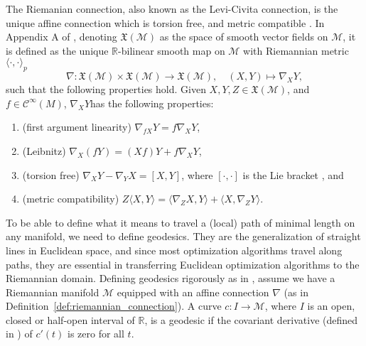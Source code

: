 \begin{definition}\label{def:riemannian_connection}
    The \textup{Riemanian connection}, also known as the \textup{Levi-Civita connection}, is the unique affine connection which is torsion free, and metric compatible \cite[Def.~6.4]{Tu2017}. In Appendix A of \cite{JensenZimmermann2024}, denoting $\mathfrak{X}(\mathcal{M})$ as the space of smooth vector fields on $\mathcal{M}$, it is defined as the unique $\mathbb{R}$-bilinear smooth map on $\mathcal{M}$ with Riemannian metric $\langle \cdot, \cdot\rangle_{p}$
    \begin{equation*}
        \nabla\colon \mathfrak{X}(\mathcal{M})\times \mathfrak{X}(\mathcal{M})\xrightarrow{}\mathfrak{X}(\mathcal{M}),\quad (X,Y)\mapsto \nabla_{X}Y,
    \end{equation*}
    such that the following properties hold. Given $X,Y,Z\in \mathfrak{X}(\mathcal{M})$, and $f\in \mathcal{C}^{\infty}(M)$, $\nabla_{X}Y$has the following properties:
    \begin{enumerate}
        \item (first argument linearity) $\nabla_{fX}Y=f \nabla_{X}Y$, 
        \item (Leibnitz) $\nabla_{X}(fY)=(Xf)Y+f \nabla_{X}Y$, 
        \item (torsion free) $\nabla_{X}Y-\nabla_{Y}X=[X,Y]$, where $[\cdot,\cdot]$ is the Lie bracket \cite[p.~186]{Lee2012:1}, and
        \item (metric compatibility) $Z \langle X,Y\rangle=\langle \nabla_{Z}X,Y\rangle+\langle X,\nabla_{Z}Y\rangle$.
    \end{enumerate}
\end{definition}

\begin{definition}[Geodesics]\label{def:geodesic}
    To be able to define what it means to travel a (local) path of minimal length on any manifold, we need to define geodesics. They are the generalization of straight
    lines in Euclidean space, and since most optimization algorithms travel along paths, they are essential in transferring Euclidean optimization algorithms to the Riemannian domain. Defining geodesics rigorously as in \cite[Def.~14.1]{Tu2017}, assume we have a Riemannian manifold $\mathcal{M}$ equipped with an affine connection $\nabla$ (as in Definition~\ref{def:riemannian_connection}). A curve $c\colon I\to \mathcal{M}$, where $I$ is an open, closed or half-open interval of $\mathbb{R}$, is a \textup{geodesic} if the covariant derivative (defined in \cite[Appendix~A]{JensenZimmermann2024}) of $c'(t)$ is zero for all $t$. 
\end{definition}

